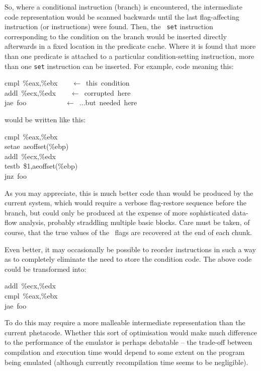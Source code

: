 So, where a conditional instruction (branch) is encountered, the intermediate code representation would be scanned backwards until the last flag-affecting instruction (or instructions) were found. Then, the \ia\ {\tt set} instruction corresponding to the condition on the branch would be inserted directly afterwards in a fixed location in the predicate cache. Where it is found that more than one predicate is attached to a particular condition-setting instruction, more than one {\tt set} instruction can be inserted. For example, code meaning this:

\begin{code}
cmpl~\%eax,\%ebx~~~~$\leftarrow$~this~condition\\
addl~\%ecx,\%edx~~~~$\leftarrow$~corrupted~here\\
jae~foo~~~~~~~~~~~$\leftarrow$~...but~needed~here
\end{code}

would be written like this:

\begin{code}
cmpl~\%eax,\%ebx\\
setae~aeoffset(\%ebp)\\
addl~\%ecx,\%edx\\
testb~\$1,aeoffset(\%ebp)\\
jnz~foo
\end{code}

As you may appreciate, this is much better code than would be produced by the current system, which would require a verbose flag-restore sequence before the branch, but could only be produced at the expense of more sophisticated data-flow analysis, probably straddling multiple basic blocks. Care must be taken, of course, that the true values of the \arm\ flags are recovered at the end of each chunk.

Even better, it may occasionally be possible to reorder instructions in such a way as to completely eliminate the need to store the condition code. The above code could be transformed into:

\begin{code}
addl~\%ecx,\%edx\\
cmpl~\%eax,\%ebx\\
jae~foo
\end{code}

To do this may require a more malleable intermediate representation than the current phetacode. Whether this sort of optimisation would make much difference to the performance of the emulator is perhaps debatable -- the trade-off between compilation and execution time would depend to some extent on the program being emulated (although currently recompilation time seems to be negligible).

